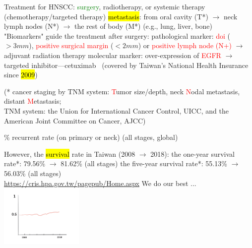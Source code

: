 \documentclass[
paper=landscape,
paper=160mm:90mm, %
fontsize=11pt, %
pagesize, %
parskip=half-, %
]{scrartcl} %
\theoremstyle{mythmstyle} %
\begin{document}
\clearpage

\thispagestyle{headings}

\begin{outline}
\1  Treatment for HNSCC: \textcolor{green}{surgery}, radiotherapy, or systemic therapy (chemotherapy/targeted therapy)
    \2 \hl{metastasis}: from oral cavity (T*) $\longrightarrow$ neck lymph nodes (N*) $\longrightarrow$ the rest of body (M*) (e.g., lung, liver, bone)
    \2 "Biomarkers" guide the treatment after surgery:
        \3 pathological marker: \textcolor{red}{\acrfull{doi}} ($> 3 mm$), \textcolor{red}{positive surgical margin} ($< 2 mm$) or \textcolor{red}{positive lymph node (N+)} $\longrightarrow$ adjuvant radiation therapy %
        \3 molecular marker: over-expression of \textcolor{red}{EGFR} $\longrightarrow$ targeted inhibitor---cetuximab~\autocite{LeTourneau2007} \hfill {\tiny (covered by Taiwan's National Health Insurance since \hl{2009})}
        
        {\tiny (* cancer staging by TNM system: \textcolor{red}{T}umor size/depth, neck \textcolor{red}{N}odal metastasis, distant \textcolor{red}{M}etastasis; \\
        TNM system: the Union for International Cancer Control, UICC, and
        the American Joint Committee on Cancer, AJCC)}
\clearpage

\% recurrent rate (on primary or neck) (all stages, global)~\autocite{Forastiere2001,Warnakulasuriya2009}

\1 However, the \hl{survival} rate in Taiwan (2008 $\longrightarrow$ 2018):
    \2 the one-year survival rate*: 79.56\% $\longrightarrow$ 81.62\% (all stages)
    \2 the five-year survival rate*: 55.13\% $\longrightarrow$ 56.03\% (all stages) \\
    {\tiny * \url{https://cris.hpa.gov.tw/pagepub/Home.aspx}}
\1 We do our best ...
\includegraphics[width=4cm]{stationary_survival_Artwork 2.jpg}



\end{outline}
\end{document}
